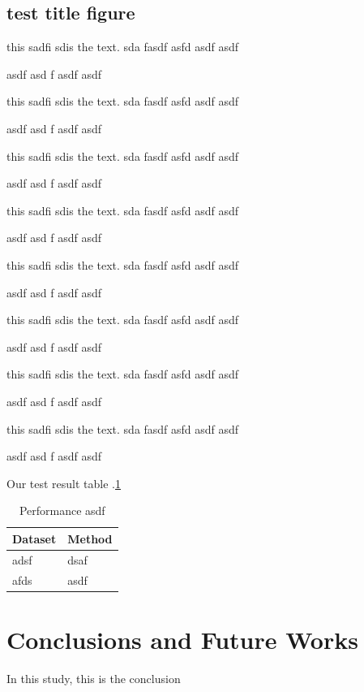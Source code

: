 \documentclass[a4paper,12pt,oneside]{book}
\begin{document}
\section{test title figure}


this sadfi sdis the text. 
sda fasdf asfd 
asdf asdf

asdf asd
f
 asdf
 asdf


 this sadfi sdis the text. 
sda fasdf asfd 
asdf asdf

asdf asd
f
 asdf
 asdf


 this sadfi sdis the text. 
sda fasdf asfd 
asdf asdf

asdf asd
f
 asdf
 asdf


 this sadfi sdis the text. 
sda fasdf asfd 
asdf asdf

asdf asd
f
 asdf
 asdf


  this sadfi sdis the text. 
sda fasdf asfd 
asdf asdf

asdf asd
f
 asdf
 asdf

  this sadfi sdis the text. 
sda fasdf asfd 
asdf asdf

asdf asd
f
 asdf
 asdf


  this sadfi sdis the text. 
sda fasdf asfd 
asdf asdf

asdf asd
f
 asdf
 asdf


  this sadfi sdis the text. 
sda fasdf asfd 
asdf asdf

asdf asd
f
 asdf
 asdf



Our test result table .\ref{tab:my-table}
\begin{table}[]
\caption{Performance asdf}
\label{tab:my-table}
\begin{tabular}{ll}
\hline
\multicolumn{1}{|c|}{\textbf{Dataset}} & \multicolumn{1}{c|}{\textbf{Method}} \\ \hline
adsf                                   & dsaf                                 \\
afds                                   & asdf                                
\end{tabular}
\end{table}



\chapter{Conclusions and Future Works}\label{chap:concl}
In this study, this is the conclusion
\end{document}

